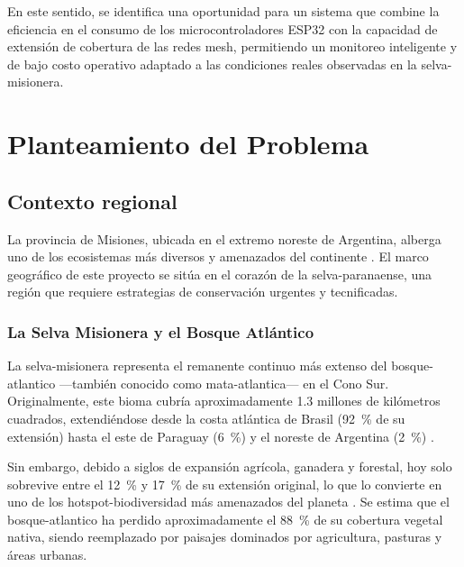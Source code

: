 \documentclass[a4paper, 12pt]{report}
\begin{document}
En este sentido, se identifica una oportunidad para un sistema que combine la
eficiencia en el consumo de los microcontroladores \gls{ESP32} con la
capacidad de extensión de cobertura de las redes \gls{mesh}, permitiendo un
monitoreo inteligente y de bajo costo operativo adaptado a las condiciones
reales observadas en la \gls{selva-misionera}.

\chapter{Planteamiento del Problema}

\section{Contexto regional}

La provincia de Misiones, ubicada en el extremo noreste de Argentina, alberga
uno de los ecosistemas más diversos y amenazados del continente \cite{wwf2024atlantic}.
El marco geográfico de este proyecto se sitúa en el corazón de la \gls{selva-paranaense},
una región que requiere estrategias de conservación urgentes y tecnificadas.

\subsection{La Selva Misionera y el Bosque Atlántico}

La \gls{selva-misionera} representa el remanente continuo más extenso del
\gls{bosque-atlantico} ---también conocido como \gls{mata-atlantica}--- en
el Cono Sur. Originalmente, este bioma cubría aproximadamente \num{1.3} millones
de kilómetros cuadrados, extendiéndose desde la costa atlántica de Brasil
(\qty{92}{\percent} de su extensión) hasta el este de Paraguay (\qty{6}{\percent}) y el noreste de
Argentina (\qty{2}{\percent}) \cite{ribeiro2009atlantic}.

Sin embargo, debido a siglos de expansión agrícola, ganadera y forestal,
hoy solo sobrevive entre el \qty{12}{\percent} y \qty{17}{\percent} de su extensión original, lo que
lo convierte en uno de los \gls{hotspot-biodiversidad} más amenazados
del planeta \cite{wwf2024atlantic}. Se estima que el \gls{bosque-atlantico}
ha perdido aproximadamente el \qty{88}{\percent} de su cobertura vegetal nativa, siendo
reemplazado por paisajes dominados por agricultura, pasturas y áreas urbanas.
\end{document}
